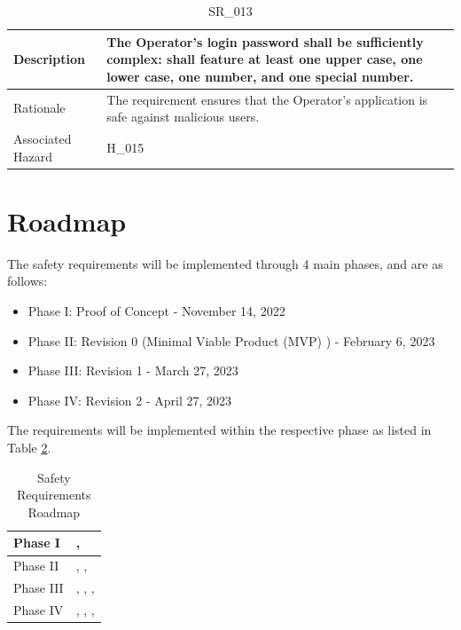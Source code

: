 \documentclass{article}
\begin{document}
\begin{table}[!h]
\begin{center}
\caption {SR\_013} 
\label{SR_013}
\begin{tabular}{ | m{3cm} | m{11cm} | }
\hline
Description & The Operator's login password shall be sufficiently complex: shall feature at least one upper case, one lower case, one number, and one special number. \\
\hline
Rationale & The requirement ensures that the Operator's application is safe against malicious users. \\
\hline
Associated Hazard & H\_015 \\
\hline
\end{tabular}
\end{center}
\end{table}

\clearpage

\section{Roadmap}

The safety requirements will be implemented through 4 main phases, and are as follows:
\begin{itemize}
    \item Phase I: Proof of Concept - November 14, 2022
    \item Phase II: Revision 0 (Minimal Viable Product (MVP) ) - February 6, 2023 
    \item Phase III: Revision 1 - March 27, 2023
    \item Phase IV: Revision 2 - April 27, 2023
\end{itemize}

The requirements will be implemented within the respective phase as listed in Table \ref{SR_Roadmap}.

\begin{table}[!h]
\begin{center}
\caption {Safety Requirements Roadmap}
\label{SR_Roadmap}
\begin{tabular}{ | m{3cm} | m{11cm} | }
\hline
Phase I & \nameref{SR_002}, \nameref{SR_010} \\
\hline
Phase II & \nameref{SR_006}, \nameref{SR_007}, \nameref{SR_013} \\
\hline
Phase III & \nameref{SR_003}, \nameref{SR_011}, \nameref{SR_012}, \nameref{SR_001} \\
\hline
Phase IV & \nameref{SR_004}, \nameref{SR_005}, \nameref{SR_008}, \nameref{SR_009} \\
\hline
\end{tabular}
\end{center}
\end{table}
\end{document}
